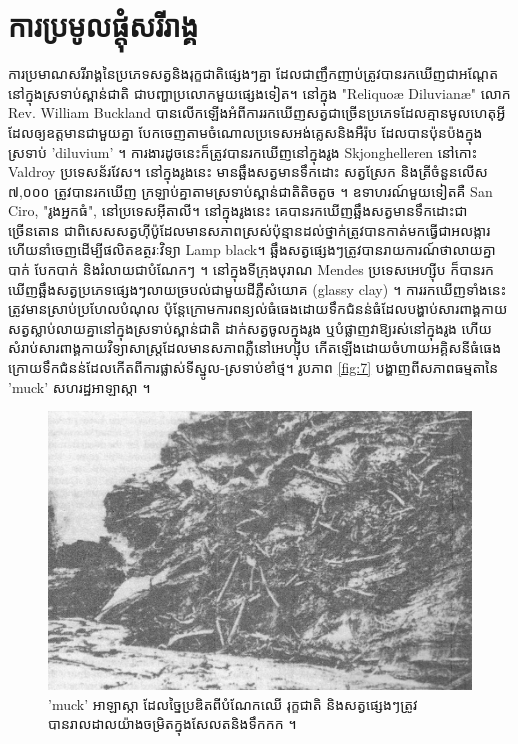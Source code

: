 \documentclass[10pt,twocolumn,letterpaper]{article}
\begin{document}
\section{ការប្រមូលផ្ដុំសរីរាង្គ}

ការប្រមាណសរីរាង្គនៃប្រភេទសត្វនិងរុក្ខជាតិផ្សេងៗគ្នា ដែលជាញឹកញាប់ត្រូវបានរកឃើញជាអណ្តែតនៅក្នុងស្រទាប់ស្ពាន់ជាតិ ជាបញ្ហាប្រលោកមួយផ្សេងទៀត។ នៅក្នុង "Reliquoæ Diluvianæ" លោក Rev. William Buckland បានលើកឡើងអំពីការរកឃើញសត្វជាច្រើនប្រភេទដែលគ្មានមូលហេតុអ្វីដែលឲ្យឧត្តមានជាមួយគ្នា បែកចេញតាមចំណោលប្រទេសអង់គ្លេសនិងអឺរ៉ុប ដែលបានប៉ុនប៉ងក្នុងស្រទាប់ 'diluvium' \cite{58}។ ការងារដូចនេះក៏ត្រូវបានរកឃើញនៅក្នុងរូង Skjonghelleren នៅកោះ Valdroy ប្រទេសន័រវែស។ នៅក្នុងរូងនេះ មានឆ្អឹងសត្វមានទឹកដោះ សត្វស្រែក និងត្រីចំនួនលើស ៧,០០០ ត្រូវបានរកឃើញ ក្រឡាប់គ្នាតាមស្រទាប់ស្ពាន់ជាតិតិចតួច \cite{59}។ ឧទាហរណ៍មួយទៀតគឺ San Ciro, "រូងអ្នកធំ", នៅប្រទេសអ៊ីតាលី។ នៅក្នុងរូងនេះ គេបានរកឃើញឆ្អឹងសត្វមានទឹកដោះជាច្រើនតោន ជាពិសេសសត្វហ៊ីប៉ូដែលមានសភាពស្រស់ប៉ុន្មានដល់ថ្នាក់ត្រូវបានកាត់មកធ្វើជាអលង្ការហើយនាំចេញដើម្បីផលិតឧត្ថរៈវិទ្យា Lamp black។ ឆ្អឹងសត្វផ្សេងៗត្រូវបានរាយការណ៍ថាលាយគ្នា បាក់ បែកបាក់ និងរំលាយជាបំណែកៗ \cite{60,61}។ នៅក្នុងទីក្រុងបុរាណ Mendes ប្រទេសអេហ្ស៊ីប ក៏បានរកឃើញឆ្អឹងសត្វប្រភេទផ្សេងៗលាយច្របល់ជាមួយដីភ្លឺសំយោគ (glassy clay) \cite{57}។ ការរកឃើញទាំងនេះត្រូវមានស្រាប់ប្រហែលបំណុល ប៉ុន្តែក្រោមការពន្យល់ធំធេងដោយទឹកជំនន់ធំដែលបង្ហាប់សារពាង្គកាយសត្វស្លាប់លាយគ្នានៅក្នុងស្រទាប់ស្ពាន់ជាតិ ដាក់សត្វចូលក្នុងរូង ឬបំផ្លាញវាឱ្យរស់នៅក្នុងរូង ហើយសំរាប់សារពាង្គកាយវិទ្យាសាស្ត្រដែលមានសភាពភ្លឺនៅអេហ្ស៊ីប កើតឡើងដោយចំហាយអគ្គិសនីធំធេងក្រោយទឹកជំនន់ដែលកើតពីការផ្លាស់ទីស្នូល-ស្រទាប់ខាំថ្ម។ រូបភាព \ref{fig:7} បង្ហាញពីសភាពធម្មតានៃ 'muck' សហរដ្ឋអាឡាស្កា \cite{56}។

\begin{figure}[t]
\begin{center}
   \includegraphics[width=1\linewidth]{muck-crop.jpeg}
\end{center}
   \caption{'muck' អាឡាស្កា ដែលច្នៃប្រឌិតពីបំណែកឈើ រុក្ខជាតិ និងសត្វផ្សេងៗត្រូវបានរាលដាលយ៉ាងចម្រិតក្នុងសែលតនិងទឹកកក \cite{146}។}
\label{fig:7}
\label{fig:onecol}
\end{figure}
\end{document}
